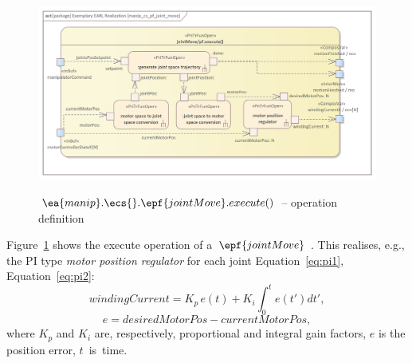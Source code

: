 \documentclass[11pt,oneside,a4paper]{article}
\newcommand{\Figure}[0]{Figure}
\begin{document}
	\begin{figure}[H]
		\centering
		\begin{center}
			{\includegraphics[width=\columnwidth]{img/basic_earl_instance/manip_cs_pf_joint_move.png}}
		\end{center}
		\caption{$\protect\ea{manip}.\protect\ecs{}.\protect\epf{jointMove}.execute()$ -- operation definition}
		\label{fig:confiop}
	\end{figure}
	
	\Figure{}~\ref{fig:confiop} shows the execute operation of a~$\epf{jointMove}$ \PrimitiveTransitionFunction{}. This \PrimitiveTransitionFunction{}
	realises, e.g., the PI type \textit{motor position regulator} for each joint Equation~\eqref{eq:pi1}, Equation~\eqref{eq:pi2}:
	\begin{equation}
	windingCurrent = K_p \, e(t) + K_i\int_{0}^{t}e(t')dt',
	\label{eq:pi1}
	\end{equation}
	\begin{equation}
	e = desiredMotorPos - currentMotorPos,
	\label{eq:pi2}
	\end{equation}
	where $K_p$ and $K_i$ are, respectively, proportional and integral gain factors, $e$ is the position error, $t$~is~time.
	
\end{document}
